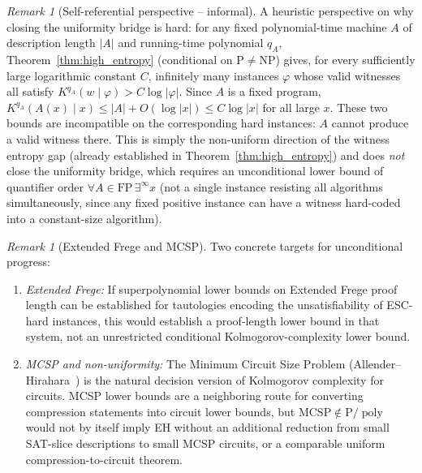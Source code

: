 \documentclass[aps,prd,twocolumn,superscriptaddress,nofootinbib]{revtex4-2}
\theoremstyle{definition}
\theoremstyle{remark}
\newtheorem{remark}[theorem]{Remark}
\DeclareMathOperator{\poly}{poly}
\newcommand{\NP}{\mathrm{NP}}
\newcommand{\PP}{\mathrm{P}}
\begin{document}

\begin{remark}[Self-referential perspective -- informal]
\label{rem:self-referential}
A heuristic perspective on why closing the uniformity bridge is hard: for any fixed polynomial-time machine $A$ of description length $|A|$ and running-time polynomial $q_A$, Theorem~\ref{thm:high_entropy} (conditional on $\PP \neq \NP$) gives, for every sufficiently large logarithmic constant $C$, infinitely many instances $\varphi$ whose valid witnesses all satisfy $K^{q_A} (w \mid \varphi) > C\log|\varphi|$. Since $A$ is a fixed program, $K^{q_A}(A(x) \mid x) \leq |A| + O(\log |x|) \leq C\log |x|$ for all large $x$. These two bounds are incompatible on the corresponding hard instances: $A$ cannot produce a valid witness there. This is simply the non-uniform direction of the witness entropy gap (already established in Theorem~\ref{thm:high_entropy}) and does \emph{not} close the uniformity bridge, which requires an unconditional lower bound of quantifier order $\forall A \in \mathrm{FP}\,\exists^\infty x$ (not a single instance resisting all algorithms simultaneously, since any fixed positive instance can have a witness hard-coded into a constant-size algorithm).
\end{remark}

\begin{remark}[Extended Frege and MCSP]
\label{rem:frege-mcsp}
Two concrete targets for unconditional progress:
\begin{enumerate}
\item \emph{Extended Frege:} If superpolynomial lower bounds on Extended Frege proof length can be established for tautologies encoding the unsatisfiability of ESC-hard instances, this would establish a proof-length lower bound in that system, not an unrestricted conditional Kolmogorov-complexity lower bound.
\item \emph{MCSP and non-uniformity:} The Minimum Circuit Size Problem (Allender--Hirahara~\cite{AllenderHirahara2019}) is the natural decision version of Kolmogorov complexity for circuits. MCSP lower bounds are a neighboring route for converting compression statements into circuit lower bounds, but $\mathrm{MCSP}\notin\PP/\poly$ would not by itself imply EH without an additional reduction from small SAT-slice descriptions to small MCSP circuits, or a comparable uniform compression-to-circuit theorem.
\end{enumerate}
\end{remark}
\end{document}
